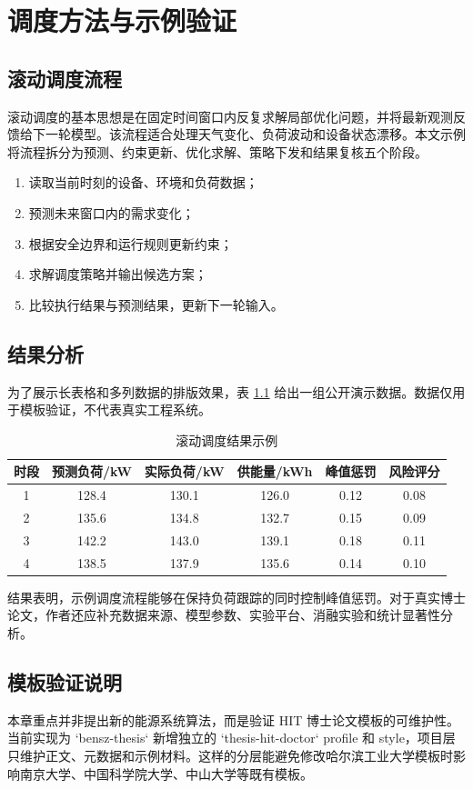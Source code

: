 \chapter{调度方法与示例验证}

\section{滚动调度流程}

滚动调度的基本思想是在固定时间窗口内反复求解局部优化问题，并将最新观测反馈给下一轮模型。该流程适合处理天气变化、负荷波动和设备状态漂移。本文示例将流程拆分为预测、约束更新、优化求解、策略下发和结果复核五个阶段。

\begin{enumerate}
  \item 读取当前时刻的设备、环境和负荷数据；
  \item 预测未来窗口内的需求变化；
  \item 根据安全边界和运行规则更新约束；
  \item 求解调度策略并输出候选方案；
  \item 比较执行结果与预测结果，更新下一轮输入。
\end{enumerate}

\section{结果分析}

为了展示长表格和多列数据的排版效果，表 \ref{tab:hit-scheduling-result} 给出一组公开演示数据。数据仅用于模板验证，不代表真实工程系统。

\begin{table}[htbp]
  \centering
  \caption{滚动调度结果示例}
  \label{tab:hit-scheduling-result}
  \begin{tabular}{cccccc}
    \toprule
    时段 & 预测负荷/kW & 实际负荷/kW & 供能量/kWh & 峰值惩罚 & 风险评分\\
    \midrule
    1 & 128.4 & 130.1 & 126.0 & 0.12 & 0.08\\
    2 & 135.6 & 134.8 & 132.7 & 0.15 & 0.09\\
    3 & 142.2 & 143.0 & 139.1 & 0.18 & 0.11\\
    4 & 138.5 & 137.9 & 135.6 & 0.14 & 0.10\\
    \bottomrule
  \end{tabular}
\end{table}

结果表明，示例调度流程能够在保持负荷跟踪的同时控制峰值惩罚。对于真实博士论文，作者还应补充数据来源、模型参数、实验平台、消融实验和统计显著性分析。

\section{模板验证说明}

本章重点并非提出新的能源系统算法，而是验证 HIT 博士论文模板的可维护性。当前实现为 `bensz-thesis` 新增独立的 `thesis-hit-doctor` profile 和 style，项目层只维护正文、元数据和示例材料。这样的分层能避免修改哈尔滨工业大学模板时影响南京大学、中国科学院大学、中山大学等既有模板。
